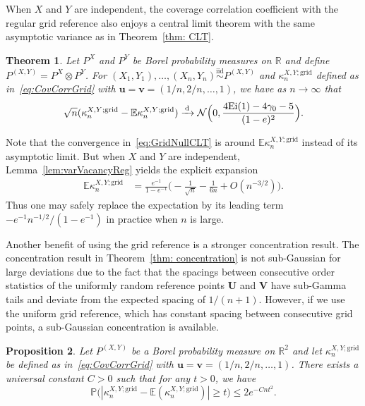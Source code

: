 \documentclass[11pt]{article}
\newtheorem{thm}{Theorem}
\newtheorem{prop}[thm]{Proposition}
\newcommand{\E}{\mathbb{E}}
\newcommand{\dto}{\xrightarrow{\,\mathrm{d}\,} }
\newcommand{\iid}{\stackrel{\mathrm{iid}}\sim}
\newcommand{\bs}[1]{\boldsymbol{#1}}
\begin{document}
When $X$ and $Y$ are independent, the coverage correlation coefficient with the regular grid reference also enjoys a central limit theorem with the same asymptotic variance as in Theorem~\ref{thm: CLT}.

\begin{thm}\label{thm:RegularGridCLT}
Let $P^X$ and $P^Y$ be Borel probability measures on $\mathbb{R}$ and define $P^{(X,Y)} = P^X\otimes P^Y$. For $(X_1,Y_1),\ldots,(X_n,Y_n)\iid P^{(X,Y)}$ and $\kappa^{X, Y; \mathrm{grid}}_n$ defined as in~\eqref{eq:CovCorrGrid} with $\bs{u} = \bs{v} = (1/n, 2/n,\ldots,1)$,  we have as $n\to\infty$ that
\begin{align}
    \sqrt{n}(\kappa^{X, Y; \mathrm{grid}}_n - \E \kappa^{X, Y; \mathrm{grid}}_n) \dto \mathcal{N}\Bigl(0,  \frac{4 \mathrm{Ei}(1) - 4\gamma_0 - 5}{(1-e)^2}\Bigr).\label{eq:GridNullCLT}
\end{align}
\end{thm}
Note that the convergence in~\eqref{eq:GridNullCLT} is around $\mathbb{E}\kappa_{n}^{X, Y; \mathrm{grid}}$ instead of its asymptotic limit. But when $X$ and $Y$ are independent, Lemma~\ref{lem:varVacancyReg} yields the explicit expansion
\begin{align*}
\E \kappa_{n}^{X, Y; \mathrm{grid}}
&= \frac{e^{-1}}{1-e^{-1}}\biggl(-\frac{1}{\sqrt{n}}-\frac{1}{6n}+O(n^{-3/2})\biggr).
\end{align*}
Thus one may safely replace the expectation by its leading term $-e^{-1}n^{-1/2}/(1-e^{-1})$ in practice when $n$ is large.

Another benefit of using the grid reference is a stronger concentration result. The concentration result in Theorem~\ref{thm: concentration} is not sub-Gaussian for large deviations due to the fact that the spacings between consecutive order statistics of the uniformly random reference points $\bs U$ and $\bs V$ have sub-Gamma tails and deviate from the expected spacing of $1/(n+1)$. However, if we use the uniform grid reference, which has constant spacing between consecutive grid points, a sub-Gaussian concentration is available. 

\begin{prop}\label{prop: concentrationGrid}
    Let $P^{(X,Y)}$ be a Borel probability measure on $\mathbb{R}^2$ and let $\kappa^{X, Y; \mathrm{grid}}_n$ be defined as in~\eqref{eq:CovCorrGrid} with $\bs{u} = \bs{v} = (1/n, 2/n,\ldots,1)$.     There exists a universal constant $C>0$ such that for any $t>0$, we have 
    \[
        \mathbb{P}\bigl(|\kappa_n^{X,Y;\mathrm{grid}} - \mathbb{E}(\kappa_n^{X,Y;\mathrm{grid}})| \geq t\bigr) \leq 2e^{-Cnt^2}.
    \]
\end{prop}
\end{document}
